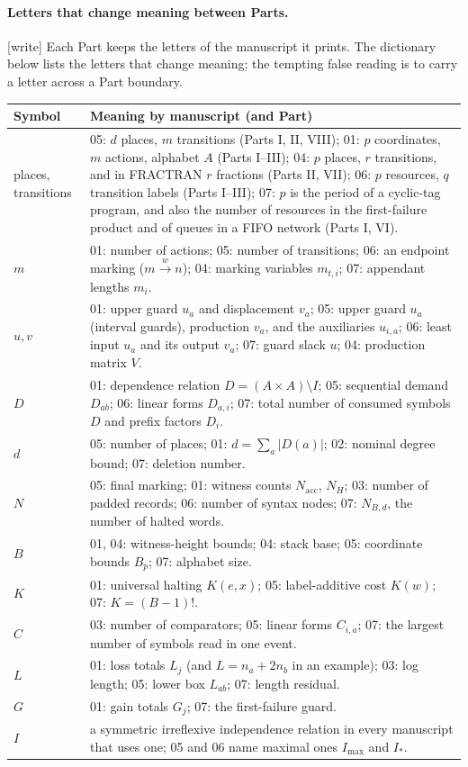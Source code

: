 \documentclass[11pt,a4paper]{article}
\theoremstyle{definition}
\theoremstyle{remark}
\newcommand{\wtag}{\textup{[write]}}%
\begin{document}
\paragraph{Letters that change meaning between Parts.}
\wtag{} Each Part keeps the letters of the manuscript it prints. The dictionary below lists the letters that change meaning; the tempting false reading is to carry a letter across a Part boundary.
\begingroup\small
\begin{longtable}{@{}p{}p{}@{}}
\toprule
Symbol & Meaning by manuscript (and Part)\\
\midrule
\endhead
places, transitions & 05: $d$ places, $m$ transitions (Parts I, II, VIII); 01: $p$ coordinates, $m$ actions, alphabet $A$ (Parts I--III); 04: $p$ places, $r$ transitions, and in FRACTRAN $r$ fractions (Parts II, VII); 06: $p$ resources, $q$ transition labels (Parts I--III); 07: $p$ is the period of a cyclic-tag program, and also the number of resources in the first-failure product and of queues in a FIFO network (Parts I, VI).\\
$m$ & 01: number of actions; 05: number of transitions; 06: an endpoint marking ($m\xrightarrow{w}n$); 04: marking variables $m_{t,i}$; 07: appendant lengths $m_i$.\\
$u,v$ & 01: upper guard $u_a$ and displacement $v_a$; 05: upper guard $u_a$ (interval guards), production $v_a$, and the auxiliaries $u_{i,a}$; 06: least input $u_a$ and its output $v_a$; 07: guard slack $u$; 04: production matrix $V$.\\
$D$ & 01: dependence relation $D=(A\times A)\setminus I$; 05: sequential demand $D_{ab}$; 06: linear forms $D_{a,i}$; 07: total number of consumed symbols $D$ and prefix factors $D_i$.\\
$d$ & 05: number of places; 01: $d=\sum_a|D(a)|$; 02: nominal degree bound; 07: deletion number.\\
$N$ & 05: final marking; 01: witness counts $N_{\mathrm{acc}}$, $N_H$; 03: number of padded records; 06: number of syntax nodes; 07: $N_{B,d}$, the number of halted words.\\
$B$ & 01, 04: witness-height bounds; 04: stack base; 05: coordinate bounds $B_p$; 07: alphabet size.\\
$K$ & 01: universal halting $K(e,x)$; 05: label-additive cost $K(w)$; 07: $K=(B-1)!$.\\
$C$ & 03: number of comparators; 05: linear forms $C_{i,a}$; 07: the largest number of symbols read in one event.\\
$L$ & 01: loss totals $L_j$ (and $L=n_a+2n_b$ in an example); 03: log length; 05: lower box $L_{ab}$; 07: length residual.\\
$G$ & 01: gain totals $G_j$; 07: the first-failure guard.\\
$I$ & a symmetric irreflexive independence relation in every manuscript that uses one; 05 and 06 name maximal ones $I_{\max}$ and $I_*$.\\
\bottomrule
\end{longtable}
\endgroup
\end{document}
